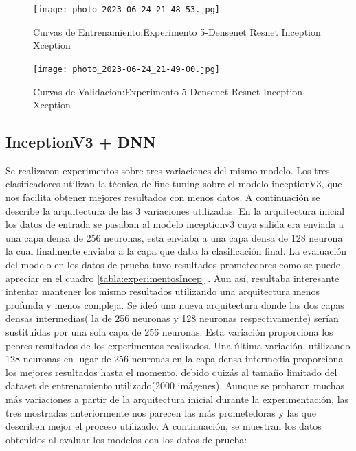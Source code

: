 \documentclass[article]{llncs}
\begin{document}
\begin{figure}[ht]
    \centering
    \texttt{[image: photo\_2023-06-24\_21-48-53.jpg]}
    \caption{Curvas de Entrenamiento:Experimento 5-Densenet Resnet Inception Xception}
    \label{fig:exp5_sample1}
    \end{figure}
    
    \begin{figure}[ht]
    \centering
    \texttt{[image: photo\_2023-06-24\_21-49-00.jpg]}
    \caption{Curvas de Validacion:Experimento 5-Densenet Resnet Inception Xception}
    \label{fig:exp5_sample2}
    \end{figure}

\subsection{InceptionV3 + DNN}

Se realizaron experimentos sobre tres variaciones del mismo modelo. Los tres clasificadores utilizan la técnica de fine tuning
sobre el modelo inceptionV3, que nos facilita obtener mejores resultados con menos datos. A continuación se describe la 
arquitectura de las 3 variaciones utilizadas:  
En la arquitectura inicial los datos de entrada se pasaban al modelo inceptionv3 cuya salida era enviada a una capa densa de 
256 neuronas, esta enviaba a una capa densa de 128 neurona la cual finalmente enviaba a la capa que daba la clasificación 
final. La evaluación del modelo en los datos de prueba tuvo resultados prometedores como se puede apreciar en el cuadro \ref{tabla:experimentosIncep} . Aun 
así, resultaba interesante intentar mantener los mismo resultados utilizando una arquitectura menos profunda y menos 
compleja. Se ideó una nueva arquitectura donde las dos capas densas intermedias( la de 256 neuronas y 128 neuronas 
respectivamente) serían sustituidas por una sola capa de 256 neuronas. Esta variación proporciona los peores resultados de 
los experimentos realizados. Una última variación, utilizando 128 neuronas en lugar de 256 neuronas en la capa densa 
intermedia proporciona los mejores resultados hasta el momento, debido quizás al tamaño limitado del dataset de entrenamiento 
utilizado(2000 imágenes). Aunque se probaron muchas más variaciones a partir de la arquitectura inicial durante la 
experimentación, las tres mostradas anteriormente nos parecen las más prometedoras y las que describen mejor el proceso 
utilizado.  
A continuación, se muestran los datos obtenidos al evaluar los modelos con los datos de prueba:
\end{document}
